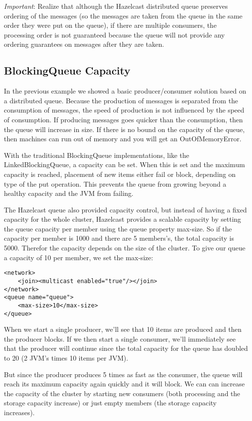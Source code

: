 \emph{Important}: Realize that although the Hazelcast distributed queue preserves ordering of the messages (so the messages are taken from the queue in the same order they were put on the queue), if there are multiple consumers, the processing order is not guaranteed because the queue will not provide any ordering guarantees on messages after they are taken.

\subsection{BlockingQueue Capacity}
In the previous example we showed a basic producer/consumer solution based on a distributed queue. Because the production of messages is separated from the consumption of messages, the speed of production is not influenced by the speed of consumption. If producing messages goes quicker than the consumption, then the queue will increase in size. If there is no bound on the capacity of the queue, then machines can run out of memory and you will get an OutOfMemoryError. 

With the traditional BlockingQueue implementations, like the LinkedBlockingQueue, a capacity can be set. When this is set and the maximum capacity is reached, placement of new items either fail or block, depending on type of the put operation. This prevents the queue from growing beyond a healthy capacity and the JVM from failing.

The Hazelcast queue also provided capacity control, but instead of having a fixed capacity for the whole cluster, Hazelcast provides a scalable capacity by setting the queue capacity per member using the queue property max-size. So if the capacity per member is 1000 and there are 5 members's, the total capacity is 5000. Therefor the capacity depends on the size of the cluster. To give our queue a capacity of 10 per member, we set the max-size:
\begin{lstlisting}
<network>
    <join><multicast enabled="true"/></join>
</network>
<queue name="queue">
    <max-size>10</max-size>
</queue>
\end{lstlisting}
When we start a single producer, we'll see that 10 items are produced and then the producer blocks. If we then start a single consumer, we'll immediately see that the producer will continue since the total capacity for the queue has doubled to 20 (2 JVM's times 10 items per JVM). 

But since the producer produces 5 times as fast as the consumer, the queue will reach its maximum capacity again quickly and it will block. We can can increase the capacity of the cluster by starting new consumers (both processing and the storage capacity increase) or just empty members (the storage capacity increases).

